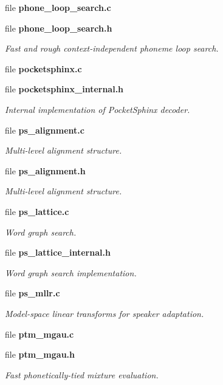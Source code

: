 \begin{DoxyCompactItemize}
file {\bfseries phone\-\_\-loop\-\_\-search.\-c}
\item 
file {\bf phone\-\_\-loop\-\_\-search.\-h}
\begin{DoxyCompactList}\small\item\em Fast and rough context-\/independent phoneme loop search. \end{DoxyCompactList}\item 
file {\bfseries pocketsphinx.\-c}
\item 
file {\bf pocketsphinx\-\_\-internal.\-h}
\begin{DoxyCompactList}\small\item\em Internal implementation of Pocket\-Sphinx decoder. \end{DoxyCompactList}\item 
file {\bf ps\-\_\-alignment.\-c}
\begin{DoxyCompactList}\small\item\em Multi-\/level alignment structure. \end{DoxyCompactList}\item 
file {\bf ps\-\_\-alignment.\-h}
\begin{DoxyCompactList}\small\item\em Multi-\/level alignment structure. \end{DoxyCompactList}\item 
file {\bf ps\-\_\-lattice.\-c}
\begin{DoxyCompactList}\small\item\em Word graph search. \end{DoxyCompactList}\item 
file {\bf ps\-\_\-lattice\-\_\-internal.\-h}
\begin{DoxyCompactList}\small\item\em Word graph search implementation. \end{DoxyCompactList}\item 
file {\bf ps\-\_\-mllr.\-c}
\begin{DoxyCompactList}\small\item\em Model-\/space linear transforms for speaker adaptation. \end{DoxyCompactList}\item 
file {\bfseries ptm\-\_\-mgau.\-c}
\item 
file {\bf ptm\-\_\-mgau.\-h}
\begin{DoxyCompactList}\small\item\em Fast phonetically-\/tied mixture evaluation. \end{DoxyCompactList}\item 

\end{DoxyCompactItemize}
